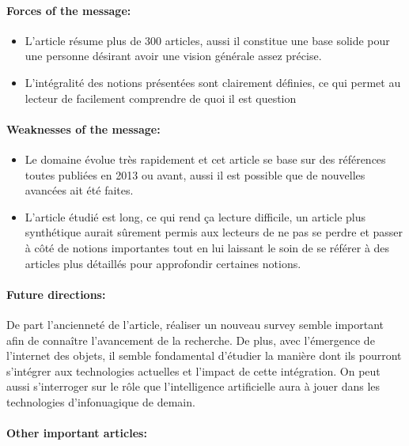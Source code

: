 \documentclass[11pt]{article}
\begin{document}
\paragraph{Forces of the message:}
\begin{itemize}
		\item L'article résume plus de 300 articles, aussi il constitue une base solide pour une personne désirant avoir une vision générale assez précise.
		\item L'intégralité des notions présentées sont clairement définies, ce qui permet au lecteur de facilement comprendre de quoi il est question
\end{itemize}


\paragraph{Weaknesses of the message:}
\begin{itemize}
		\item Le domaine évolue très rapidement et cet article se base sur des références toutes publiées en 2013 ou avant, aussi il est possible que de 
			nouvelles avancées ait été faites.
		\item L'article étudié est long, ce qui rend ça lecture difficile, un article plus synthétique aurait sûrement permis aux lecteurs de ne pas se perdre et 
			passer à côté de notions importantes tout en lui laissant le soin de se référer à des articles plus détaillés pour approfondir certaines notions.
\end{itemize}

\paragraph{Future directions:}
De part l'ancienneté de l'article, réaliser un nouveau survey semble important afin de connaître l'avancement de la recherche. De plus, avec l'émergence de l'internet des
objets, il semble fondamental d'étudier la manière dont ils pourront s'intégrer aux technologies actuelles et l'impact de cette intégration. On peut aussi s'interroger sur
le rôle que l'intelligence artificielle aura à jouer dans les technologies d'infonuagique de demain.
\paragraph{Other important articles:}
\end{document}
